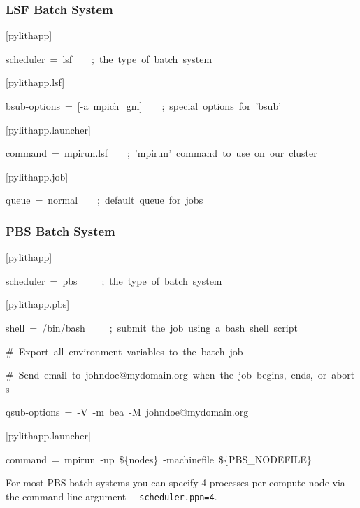 \subsubsection{LSF Batch System}
\begin{lyxcode}
{[}pylithapp{]}

scheduler~=~lsf~~~~;~the~type~of~batch~system



{[}pylithapp.lsf{]}

bsub-options~=~{[}-a~mpich\_gm{]}~~~~;~special~options~for~'bsub'



{[}pylithapp.launcher{]}

command~=~mpirun.lsf~~~~;~'mpirun'~command~to~use~on~our~cluster



{[}pylithapp.job{]}

queue~=~normal~~~~;~default~queue~for~jobs
\end{lyxcode}

\subsubsection{PBS Batch System}
\begin{lyxcode}
{[}pylithapp{]}

scheduler~=~pbs~~~~~;~the~type~of~batch~system



{[}pylithapp.pbs{]}

shell~=~/bin/bash~~~~~;~submit~the~job~using~a~bash~shell~script



\#~Export~all~environment~variables~to~the~batch~job

\#~Send~email~to~johndoe@mydomain.org~when~the~job~begins,~ends,~or~aborts

qsub-options~=~-V~-m~bea~-M~johndoe@mydomain.org



{[}pylithapp.launcher{]}

command~=~mpirun~-np~\$\{nodes\}~-machinefile~\$\{PBS\_NODEFILE\}
\end{lyxcode}
For most PBS batch systems you can specify 4 processes per compute
node via the command line argument \texttt{-{}-scheduler.ppn=4}.

